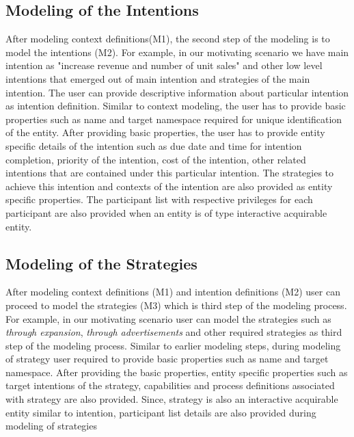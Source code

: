 \subsection{Modeling of the Intentions}
After modeling context definitions(M1), the second step of the modeling is to model the intentions (M2). For example, in our motivating scenario we have main intention as "increase revenue and number of unit sales" and other low level intentions that emerged out of main intention and strategies of the main intention. The user can provide descriptive information about particular intention as intention definition. Similar to context modeling, the user has to provide basic properties such as name and target namespace required for unique identification of the entity. After providing basic properties, the user has to provide entity specific details of the intention such as due date and time for intention completion, priority of the intention, cost of the intention, other related intentions that are contained under this particular intention. The strategies to achieve this intention and contexts of the intention are also provided as entity specific properties. The participant list with respective privileges for each participant are also provided when an entity is of type interactive acquirable entity. 

\subsection{Modeling of the Strategies}
After modeling context definitions (M1) and intention definitions (M2) user can proceed to model the strategies (M3) which is third step of the modeling process. For example, in our motivating scenario user can model the strategies such as \textit{through expansion}, \textit{through advertisements} and other required strategies as third step of the modeling process. Similar to earlier modeling steps, during modeling of strategy user required to provide basic properties such as name and target namespace. After providing the basic properties, entity specific properties such as target intentions of the strategy, capabilities and process definitions associated with strategy are also provided. Since, strategy is also an interactive acquirable entity similar to intention, participant list details are also provided during modeling of strategies

